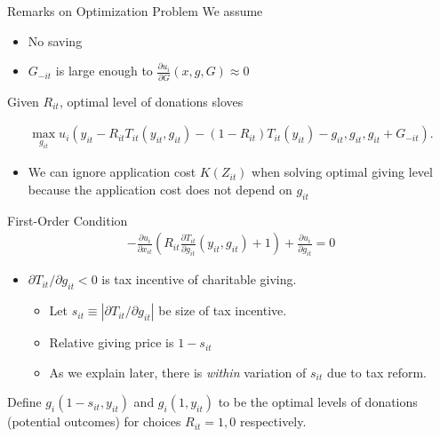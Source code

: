 \documentclass[
  ignorenonframetext,
  aspectratio=169,
]{beamer}
\providecommand{\tightlist}{%
  \setlength{\itemsep}{0pt}\setlength{\parskip}{0pt}}
\begin{document}
\begin{frame}{Remarks on Optimization Problem}
\protect\hypertarget{remarks-on-optimization-problem}{}
We assume

\begin{itemize}
\tightlist
\item
  No saving
\item
  \(G_{-it}\) is large enough to \(\frac{\partial u_i}{\partial G}(x, g, G) \approx 0\)
\end{itemize}

Given \(R_{it}\), optimal level of donations sloves

\begin{align}
  \max_{g_{it}} u_i(
    y_{it} - R_{it} T_{it}(y_{it}, g_{it}) - (1 - R_{it}) T_{it}(y_{it}) - g_{it}, g_{it}, g_{it} + G_{-it}
  ).
\end{align}

\begin{itemize}
\tightlist
\item
  We can ignore application cost \(K(Z_{it})\) when solving optimal giving level because the application cost does not depend on \(g_{it}\)
\end{itemize}
\end{frame}

\begin{frame}{First-Order Condition}
\protect\hypertarget{first-order-condition}{}
\begin{align}
  - \frac{\partial u_i}{\partial x_{it}}
  \left( R_{it} \frac{\partial T_{it}}{\partial g_{it}}(y_{it}, g_{it}) + 1 \right)
  + \frac{\partial u_i}{\partial g_{it}} = 0
\end{align}

\begin{itemize}
\tightlist
\item
  \(\partial T_{it} / \partial g_{it} < 0\) is tax incentive of charitable giving.

  \begin{itemize}
  \tightlist
  \item
    Let \(s_{it} \equiv |\partial T_{it} / \partial g_{it}|\) be size of tax incentive.
  \item
    Relative giving price is \(1 - s_{it}\)
  \item
    As we explain later, there is \emph{within} variation of \(s_{it}\) due to tax reform.
  \end{itemize}
\end{itemize}

Define \(g_i(1 - s_{it}, y_{it})\) and \(g_i(1, y_{it})\) to be the optimal levels of donations (potential outcomes) for choices \(R_{it} = 1, 0\) respectively.
\end{frame}
\end{document}
